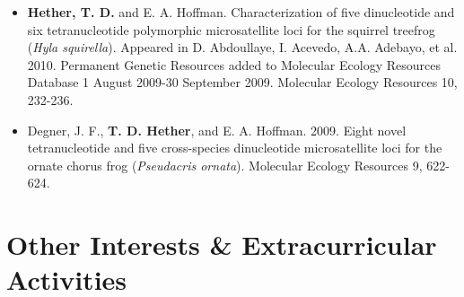 \documentclass[11pt,letterpaper,sans]{moderncv}        %
\begin{document}
\begin{itemize}
\vspace{4pt}
\item \textbf{Hether, T. D.} and E. A. Hoffman. Characterization of five dinucleotide and six tetranucleotide polymorphic microsatellite loci for the squirrel treefrog (\emph{Hyla squirella}).  Appeared in D. Abdoullaye, I. Acevedo, A.A. Adebayo, et al. 2010. Permanent Genetic Resources added to Molecular Ecology Resources Database 1 August 2009-30 September 2009. Molecular Ecology Resources 10, 232-236.
\vspace{4pt}
\item Degner, J. F., \textbf{T. D. Hether}, and E. A. Hoffman. 2009. Eight novel tetranucleotide and five cross-species dinucleotide microsatellite loci for the ornate chorus frog (\emph{Pseudacris ornata}). Molecular Ecology Resources 9, 622-624.

\end{itemize}

\section{Other Interests \& Extracurricular Activities}

\end{document}

